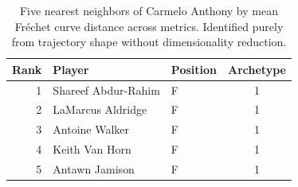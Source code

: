 \begin{table}[htbp]
  \centering\small
  \begin{tabular}{rllc}
    \toprule
    Rank & Player & Position & Archetype \\
    \midrule
    1 & Shareef Abdur-Rahim & F & 1 \\
    2 & LaMarcus Aldridge & F & 1 \\
    3 & Antoine Walker & F & 1 \\
    4 & Keith Van Horn & F & 1 \\
    5 & Antawn Jamison & F & 1 \\
    \bottomrule
  \end{tabular}
  \caption{Five nearest neighbors of Carmelo Anthony by mean Fr\'{e}chet curve distance across metrics. Identified purely from trajectory shape without dimensionality reduction.}
  \label{tab:Carmelo_Anthony_frechet_curve_neighbors}
\end{table}

